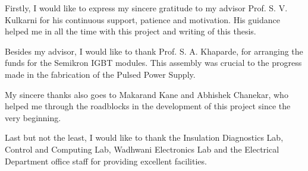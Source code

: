 \acknowledgments

Firstly, I would like to express my sincere gratitude to my advisor Prof. S. V. Kulkarni for his continuous support, patience and motivation. His guidance helped me in all the time with this project and writing of this thesis.

Besides my advisor, I would like to thank Prof. S. A. Khaparde, for arranging the funds for the Semikron IGBT modules. This assembly was crucial to the progress made in the fabrication of the Pulsed Power Supply.

My sincere thanks also goes to Makarand Kane and Abhishek Chanekar, who helped me through the roadblocks in the development of this project since the very beginning.

Last but not the least, I would like to thank the Insulation Diagnostics Lab, Control and Computing Lab, Wadhwani Electronics Lab and the Electrical Department office staff for providing excellent facilities.


\signature{\today}

